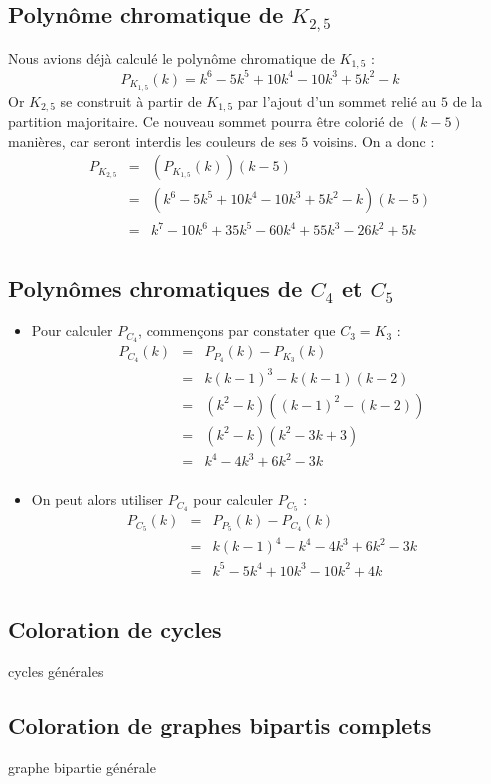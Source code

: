 \subsection{Polynôme chromatique de $K_{2,5}$}
Nous avions déjà calculé le polynôme chromatique de $K_{1,5}$ :
\[ P_{K_{1,5}}(k) = k^6 - 5k^5  + 10k^4 - 10k^3 + 5k^2 - k \]
Or $K_{2,5}$ se construit à partir de $K_{1,5}$ par l'ajout d'un sommet relié au $5$ de la partition majoritaire. Ce nouveau sommet pourra être colorié de $(k-5)$ manières, car seront interdis les couleurs de ses $5$ voisins. On a donc :
\begin{eqnarray*}
P_{K_{2,5}} & = &	(P_{K_{1,5}}(k))(k-5)								\\
			& = & 	(k^6 - 5k^5  + 10k^4 - 10k^3 + 5k^2 - k)(k-5)		\\	
			& = &	k^7 - 10k^6 + 35k^5 - 60k^4 + 55k^3 - 26k^2 + 5k	\\
\end{eqnarray*}

\subsection{Polynômes chromatiques de $C_4$ et $C_5$}
\begin {itemize}
\item Pour calculer $P_{C_4}$, commençons par constater que $C_3 = K_3$ :
\begin{eqnarray*}
P_{C_4}(k)	& = &	P_{P_4}(k) - P_{K_3}(k)				\\
			& = & 	k(k-1)^3 - k(k-1)(k-2)				\\
			& = & 	(k^2 - k)((k-1)^2 - (k-2))			\\
			& = &	(k^2 - k)(k^2 - 3k + 3)				\\
			& = & 	k^4 - 4k^3 + 6k^2 - 3k				\\			
\end{eqnarray*}
\item On peut alors utiliser $P_{C_4}$ pour calculer $P_{C_5}$ :
\begin{eqnarray*}
P_{C_5}(k)	& = &	P_{P_5}(k) - P_{C_4}(k)				\\
			& = & 	k(k-1)^4 - k^4 -4k^3 + 6k^2 - 3k	\\
			& = &	k^5 - 5k^4 + 10k^3 - 10k^2 + 4k		\\ 
\end{eqnarray*}
\end {itemize}

\subsection{Coloration de cycles}
cycles générales

\subsection{Coloration de graphes bipartis complets}
graphe bipartie générale